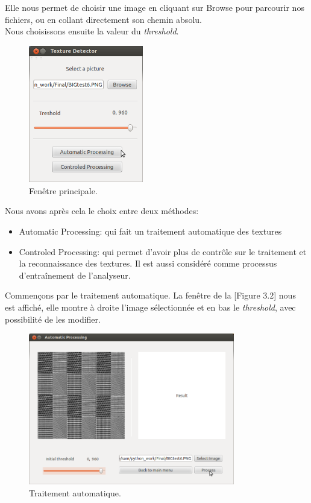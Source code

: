 \fi

Elle nous permet de choisir une image en cliquant sur Browse pour parcourir nos fichiers, ou en collant directement son chemin absolu.\\
Nous choisissons ensuite la valeur du \textit{threshold}.

\begin{figure}[H]
	\centering
		\includegraphics[width=5cm,]{Figures/chap3/3.png}
			\caption[choice1]{Fenêtre principale.}
	\label{fig:choice1}
\end{figure}

\indent Nous avons après cela le choix entre deux méthodes: 
\begin{itemize}


\item Automatic Processing: qui fait un traitement automatique des textures \\
\item Controled Processing: qui permet d'avoir plus de contrôle sur le traitement et la reconnaissance des textures. Il est aussi considéré comme processus d’entraînement de l'analyseur.\\
\end{itemize}
\indent Commençons par le traitement automatique. La fenêtre de la [Figure 3.2] nous est affiché, elle montre à droite l'image sélectionnée et en bas le \textit{threshold}, avec possibilité de les modifier.

\begin{figure}[H]
	\centering
		\includegraphics[width=9cm,]{Figures/chap3/4.png}
	\caption[traitementAuto]{Traitement automatique.}
	\label{fig:traitementAuto}
\end{figure}

